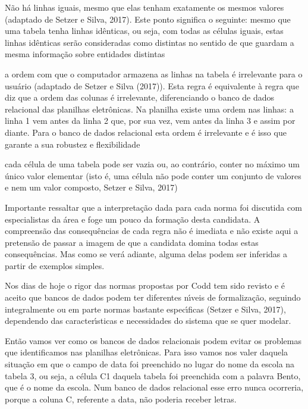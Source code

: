 \documentclass[
12pt,		%
openright,	%
twoside,  %
a4paper,			%
chapter=TITLE,		%
english,			%
french,				%
spanish,			%
brazil				%
]{USPSC-classe/USPSC}
\begin{document}
\begin{alineas}
\item N\~ao h\'a linhas iguais, mesmo que elas tenham exatamente os mesmos valores  (adaptado de Setzer e Silva, 2017). Este ponto significa o seguinte: mesmo que uma tabela tenha linhas id\^enticas, ou seja, com todas as c\'elulas iguais, estas linhas id\^enticas ser\~ao consideradas como distintas no sentido de que guardam a mesma informa\c{c}\~ao sobre entidades distintas
\item a ordem com que o computador armazena as linhas na tabela \'e irrelevante para o usu\'ario  (adaptado de Setzer e Silva (2017)). Esta regra \'e equivalente \`a regra que diz que a ordem das colunas \'e irrelevante, diferenciando o banco de dados relacional das planilhas eletr\^onicas. Na planilha existe uma ordem nas linhas: a linha 1 vem antes da linha 2 que, por sua vez, vem antes da linha 3 e assim por diante. Para o banco de dados relacional esta ordem \'e irrelevante e \'e isso que garante a sua robustez e flexibilidade
\item cada c\'elula de uma tabela pode ser vazia ou, ao contr\'ario, conter no m\'aximo um \'unico valor elementar (isto \'e, uma c\'elula n\~ao pode conter um conjunto de valores e nem um valor composto, Setzer e Silva, 2017)
\end{alineas}

Importante ressaltar que a interpreta\c{c}\~ao dada para cada norma foi discutida com especialistas da \'area e foge um pouco da forma\c{c}\~ao desta candidata. A compreens\~ao das consequ\^encias de cada regra n\~ao \'e imediata e n\~ao existe aqui a pretens\~ao de passar a imagem de que a candidata domina todas estas consequ\^encias. Mas como se ver\'a adiante, alguma delas podem ser inferidas a partir de exemplos simples.









Nos dias de hoje o rigor das normas propostas por Codd tem sido revisto e \'e aceito que bancos de dados podem ter diferentes n\'{\i}veis de formaliza\c{c}\~ao, seguindo integralmente ou em parte normas bastante espec\'{\i}ficas (Setzer e Silva, 2017), dependendo das caracter\'{\i}sticas e necessidades do sistema que se quer modelar.









Ent\~ao vamos ver como os bancos de dados relacionais podem evitar os problemas que identificamos nas planilhas eletr\^onicas. Para isso vamos nos valer daquela situa\c{c}\~ao em que o campo de data foi preenchido no lugar do nome da escola na tabela 3, ou seja, a c\'elula C1 daquela tabela foi preenchida com a palavra \textquotedbl Bento\textquotedbl , que \'e o nome da escola. Num banco de dados relacional esse erro nunca ocorreria, porque a coluna C, referente a data, n\~ao poderia receber letras.
\end{document}
